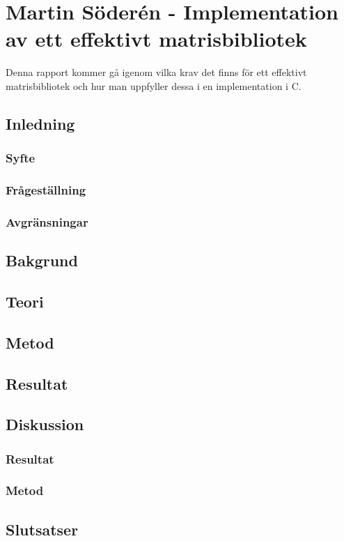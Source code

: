 \section{Martin Söderén - Implementation av ett effektivt matrisbibliotek} 
Denna rapport kommer gå igenom vilka krav det finns för ett effektivt matrisbibliotek och hur man uppfyller dessa i en implementation i C.
	\subsection{Inledning}
	\subsubsection{Syfte}
	\subsubsection{Frågeställning}
	\subsubsection{Avgränsningar}
	\subsection{Bakgrund}
	\subsection{Teori}
	\subsection{Metod}
	\subsection{Resultat}
	\subsection{Diskussion}
	\subsubsection{Resultat}
	\subsubsection{Metod}
	\subsection{Slutsatser}
